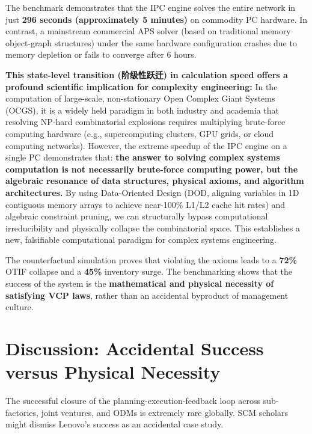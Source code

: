 \documentclass[11pt,a4paper]{article}
\begin{document}
The benchmark demonstrates that the IPC engine solves the entire network in just \textbf{296 seconds (approximately 5 minutes)} on commodity PC hardware. In contrast, a mainstream commercial APS solver (based on traditional memory object-graph structures) under the same hardware configuration crashes due to memory depletion or fails to converge after 6 hours.

\textbf{This state-level transition (阶级性跃迁) in calculation speed offers a profound scientific implication for complexity engineering:}
In the computation of large-scale, non-stationary Open Complex Giant Systems (OCGS), it is a widely held paradigm in both industry and academia that resolving NP-hard combinatorial explosions requires multiplying brute-force computing hardware (e.g., supercomputing clusters, GPU grids, or cloud computing networks). However, the extreme speedup of the IPC engine on a single PC demonstrates that: \textbf{the answer to solving complex systems computation is not necessarily brute-force computing power, but the algebraic resonance of data structures, physical axioms, and algorithm architectures.} By using Data-Oriented Design (DOD, aligning variables in 1D contiguous memory arrays to achieve near-100\% L1/L2 cache hit rates) and algebraic constraint pruning, we can structurally bypass computational irreducibility and physically collapse the combinatorial space. This establishes a new, falsifiable computational paradigm for complex systems engineering.

The counterfactual simulation proves that violating the axioms leads to a \textbf{72\%} OTIF collapse and a \textbf{45\%} inventory surge. The benchmarking shows that the success of the system is the \textbf{mathematical and physical necessity of satisfying VCP laws}, rather than an accidental byproduct of management culture.

\section{Discussion: Accidental Success versus Physical Necessity}
The successful closure of the planning-execution-feedback loop across sub-factories, joint ventures, and ODMs is extremely rare globally. SCM scholars might dismiss Lenovo's success as an accidental case study.
\end{document}
